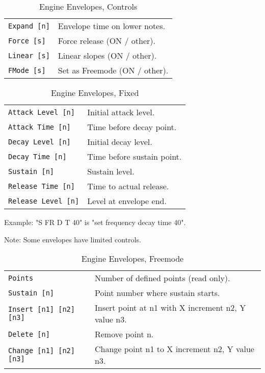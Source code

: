    \begin{table}[H]
      \centering
      \caption{Engine Envelopes, Controls}
      \label{table:yoshimi_engine_envelopes_controls}
      \begin{tabular}{l l}
\texttt{Expand [n]} &
   Envelope time on lower notes. \\
\texttt{Force [s]} &
   Force release (ON / other). \\
\texttt{Linear [s]} &
   Linear slopes (ON / other). \\
\texttt{FMode [s]} &
   Set as Freemode (ON / other). \\
      \end{tabular}
   \end{table}

   \begin{table}[H]
      \centering
      \caption{Engine Envelopes, Fixed}
      \label{table:yoshimi_engine_envelopes_fixed}
      \begin{tabular}{l l}
\texttt{Attack Level [n]} &
   Initial attack level. \\
\texttt{Attack Time [n]} &
   Time before decay point. \\
\texttt{Decay Level [n]} &
   Initial decay level. \\
\texttt{Decay Time [n]} &
   Time before sustain point. \\
\texttt{Sustain [n]} &
   Sustain level. \\
\texttt{Release Time [n]} &
   Time to actual release. \\
\texttt{Release Level [n]} &
   Level at envelope end. \\
      \end{tabular}
   \end{table}

Example: "S FR D T 40" is "set frequency decay time 40".

Note: Some envelopes have limited controls.

   \begin{table}[H]
      \centering
      \caption{Engine Envelopes, Freemode}
      \label{table:yoshimi_engine_envelopes_freemode}
      \begin{tabular}{l l}
\texttt{Points} &
   Number of defined points (read only). \\
\texttt{Sustain [n]} &
   Point number where sustain starts. \\
\texttt{Insert [n1] [n2] [n3]} &
   Insert point at n1 with X increment n2, Y value n3. \\
\texttt{Delete [n]} &
   Remove point n. \\
\texttt{Change [n1] [n2] [n3]} &
   Change point n1 to X increment n2, Y value n3. \\
      \end{tabular}
   \end{table}

